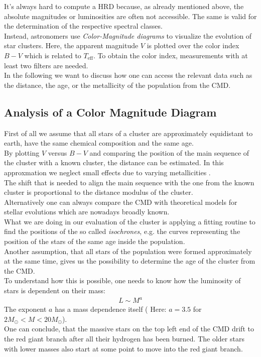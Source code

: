 It's always hard to compute a HRD because, as already mentioned above, the absolute magnitudes or luminosities are often not accessible. The same is valid for the determination of the respective spectral classes. \\
Instead, astronomers use \textit{Color-Magnitude diagrams} to visualize the evolution of star clusters. Here, the apparent magnitude $V$ is plotted over the color index $B-V$ which is related to $T_{\text{eff}}$.
To obtain the color index, measurements with at least two filters are needed. \\
In the following we want to discuss how one can access the relevant data such as the distance, the age, or the metallicity of the population from the CMD.
\subsection*{Analysis of a Color Magnitude Diagram}
First of all we assume that all stars of a cluster are approximately equidistant to earth, have the same chemical composition and the same age. \\
By plotting $V$ versus $B-V$ and comparing the position of the main sequence of the cluster with a known cluster, the distance can be estimated. In this approxmation we neglect small effects due to varying metallicities . \\
The shift that is needed to align the main sequence with the one from the known cluster is proportional to the distance modulus of the cluster. \\
Alternatively one can always compare the CMD with theoretical models for stellar evolutions which are nowadays broadly known. \\
What we are doing in our evaluation of the cluster is applying a fitting routine to find the positions of the so called \textit{isochrones}, e.g. the curves representing the position of the stars of the same age inside the population. \\
Another assumption, that all stars of the population were  formed approximately at the same time, gives us the possibility to determine the age of the cluster from the CMD. \\
To understand how this is possible, one needs to know how the luminosity of stars is dependent on their mass:
\begin{align}
	L \sim M^a
\end{align}
 The exponent $a$ has a mass dependence itself ( Here: $a = 3.5 $ for $2M_{\odot} < M < 20M_{\odot}$). \\ One can conclude, that the massive stars on the top left end of the CMD drift to the red giant branch after all their hydrogen has been burned. The older stars with lower masses also start at some point to move into the red giant branch. \\
